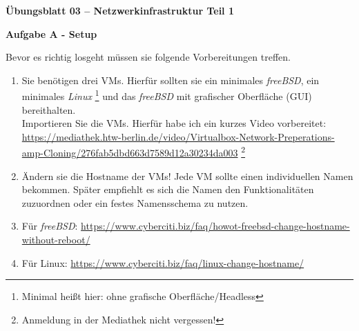 \documentclass[paper=a4,fontsize=11pt]{scrartcl}%
\begin{document}
\begin{center}
\Large{\textbf{Übungsblatt 03 -- Netzwerkinfrastruktur Teil 1}}\\
\end{center}

\begin{center}\Large{\textbf{Aufgabe A - Setup}}\end{center}
Bevor es richtig losgeht müssen sie folgende Vorbereitungen treffen.
\begin{enumerate}
	\item Sie benötigen drei VMs. Hierfür sollten sie ein minimales \emph{freeBSD}, ein minimales \emph{Linux} \footnote{Minimal heißt hier: ohne grafische Oberfläche/Headless} und das \emph{freeBSD} mit grafischer Oberfläche (GUI) bereithalten. \\
Importieren Sie die VMs. Hierfür habe ich ein kurzes Video vorbereitet: \url{https://mediathek.htw-berlin.de/video/Virtualbox-Network-Preperations-amp-Cloning/276fab5dbd663d7589d12a30234da003} \footnote{Anmeldung in der Mediathek nicht vergessen!}
	\item Ändern sie die Hostname der VMs! Jede VM sollte einen individuellen Namen bekommen. Später empfiehlt es sich die Namen den Funktionalitäten zuzuordnen oder ein festes Namensschema zu nutzen. 
	 \item Für \emph{freeBSD}: \url{https://www.cyberciti.biz/faq/howot-freebsd-change-hostname-without-reboot/}
	 \item Für Linux: \url{https://www.cyberciti.biz/faq/linux-change-hostname/}
\end{enumerate}
	
\end{document}
